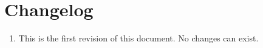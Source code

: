 \section {Changelog}

\begin {enumerate}

\item[1.0.0.0] {This is the first revision of this document. No changes can exist.}

\end {enumerate}